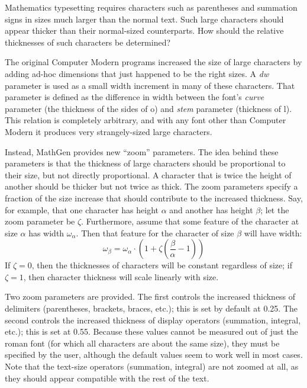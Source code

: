 
Mathematics typesetting requires characters such as parentheses and summation
signs in sizes much larger than the normal text. Such large characters should
appear thicker than their normal-sized counterparts. How should the relative
thicknesses of such characters be determined?

The original Computer Modern programs increased the size of large characters by
adding ad-hoc dimensions that just happened to be the right sizes. A \emph{dw}
parameter is used as a small width increment in many of these characters. That
parameter is defined as the difference in width between the font's \emph{curve}
parameter (the thickness of the sides of o) and \emph{stem} parameter (thickness
of l). This relation is completely arbitrary, and with any font other than
Computer Modern it produces very strangely-sized large characters.

Instead, MathGen provides new ``zoom'' parameters. The idea behind these
parameters is that the thickness of large characters should be proportional to
their size, but not directly proportional. A character that is twice the height
of another should be thicker but not twice as thick. The zoom parameters specify
a fraction of the size increase that should contribute to the increased
thickness. Say, for example, that one character has height $\alpha$ and another
has height $\beta$; let the zoom parameter be $\zeta$. Furthermore, assume that
some feature of the character at size $\alpha$ has width $\omega_\alpha$. Then
that feature for the character of size $\beta$ will have width:
\[
\omega_\beta = \omega_\alpha \cdot
\left( 1 + \zeta\left(\frac{\beta}{\alpha} - 1\right)\right)
\]
If $\zeta=0$, then the thicknesses of characters will be constant regardless of
size; if $\zeta=1$, then character thickness will scale linearly with size.

Two zoom parameters are provided. The first controls the increased thickness of
delimiters (parentheses, brackets, braces, etc.); this is set by default at
0.25. The second controls the increased thickness of display operators
(summation, integral, etc.); this is set at 0.55. Because these values cannot be
measured out of just the roman font (for which all characters are about the same
size), they must be specified by the user, although the default values seem to
work well in most cases. Note that the text-size operators (summation, integral)
are not zoomed at all, as they should appear compatible with the rest of the
text.
